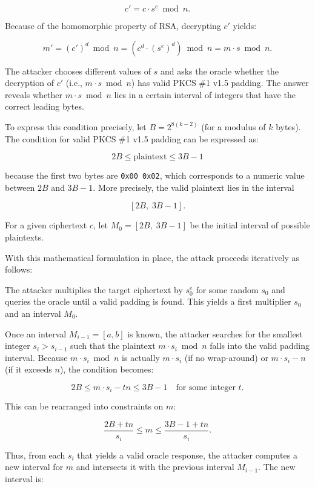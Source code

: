 \[
c' = c \cdot s^e \bmod n.
\]

Because of the homomorphic property of RSA, decrypting \(c'\) yields:

\[
m' = (c')^d \bmod n = (c^d \cdot (s^e)^d) \bmod n = m \cdot s \bmod n.
\]

The attacker chooses different values of \(s\) and asks the oracle whether the decryption of \(c'\) (i.e., \(m \cdot s \bmod n\)) has valid PKCS \#1 v1.5 padding. The answer reveals whether \(m \cdot s \bmod n\) lies in a certain interval of integers that have the correct leading bytes.

To express this condition precisely, let \(B = 2^{8(k-2)}\) (for a modulus of \(k\) bytes). The condition for valid PKCS \#1 v1.5 padding can be expressed as:

\[
2B \le \text{plaintext} \le 3B - 1
\]

because the first two bytes are \texttt{0x00 0x02}, which corresponds to a numeric value between \(2B\) and \(3B-1\). More precisely, the valid plaintext lies in the interval

\[
[2B,\; 3B-1].
\]

For a given ciphertext \(c\), let \(M_0 = [2B,\; 3B-1]\) be the initial interval of possible plaintexts.

With this mathematical formulation in place, the attack proceeds iteratively as follows:

The attacker multiplies the target ciphertext by \(s_0^e\) for some random \(s_0\) and queries the oracle until a valid padding is found. This yields a first multiplier \(s_0\) and an interval \(M_0\).

Once an interval \(M_{i-1} = [a, b]\) is known, the attacker searches for the smallest integer \(s_i > s_{i-1}\) such that the plaintext \(m \cdot s_i \bmod n\) falls into the valid padding interval. Because \(m \cdot s_i \bmod n\) is actually \(m \cdot s_i\) (if no wrap‑around) or \(m \cdot s_i - n\) (if it exceeds \(n\)), the condition becomes:

\[
2B \le m \cdot s_i - t n \le 3B-1 \quad \text{for some integer } t.
\]

This can be rearranged into constraints on \(m\):

\[
\frac{2B + t n}{s_i} \le m \le \frac{3B-1 + t n}{s_i}.
\]

Thus, from each \(s_i\) that yields a valid oracle response, the attacker computes a new interval for \(m\) and intersects it with the previous interval \(M_{i-1}\). The new interval is:

